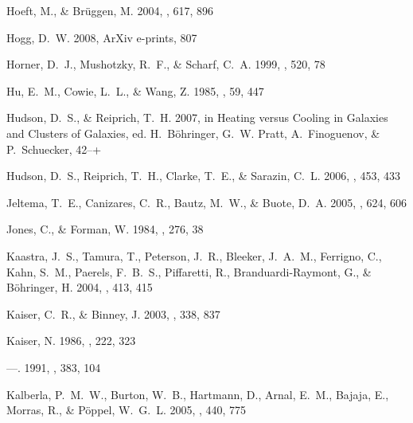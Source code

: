 \documentclass[12pt,preprint]{aastex}
\begin{document}
\begin{thebibliography}{138}
{Hoeft}, M., \& {Br{\"u}ggen}, M. 2004, \apj, 617, 896

{Hogg}, D.~W. 2008, ArXiv e-prints, 807

{Horner}, D.~J., {Mushotzky}, R.~F., \& {Scharf}, C.~A. 1999, \apj, 520, 78

{Hu}, E.~M., {Cowie}, L.~L., \& {Wang}, Z. 1985, \apjs, 59, 447

{Hudson}, D.~S., \& {Reiprich}, T.~H. 2007, in Heating versus Cooling in
  Galaxies and Clusters of Galaxies, ed. H.~{B{\"o}hringer}, G.~W. {Pratt},
  A.~{Finoguenov}, \& P.~{Schuecker}, 42--+

{Hudson}, D.~S., {Reiprich}, T.~H., {Clarke}, T.~E., \& {Sarazin}, C.~L. 2006,
  \aap, 453, 433

{Jeltema}, T.~E., {Canizares}, C.~R., {Bautz}, M.~W., \& {Buote}, D.~A. 2005,
  \apj, 624, 606

{Jones}, C., \& {Forman}, W. 1984, \apj, 276, 38

{Kaastra}, J.~S., {Tamura}, T., {Peterson}, J.~R., {Bleeker}, J.~A.~M.,
  {Ferrigno}, C., {Kahn}, S.~M., {Paerels}, F.~B.~S., {Piffaretti}, R.,
  {Branduardi-Raymont}, G., \& {B{\" o}hringer}, H. 2004, \aap, 413, 415

{Kaiser}, C.~R., \& {Binney}, J. 2003, \mnras, 338, 837

{Kaiser}, N. 1986, \mnras, 222, 323

---. 1991, \apj, 383, 104

{Kalberla}, P.~M.~W., {Burton}, W.~B., {Hartmann}, D., {Arnal}, E.~M.,
  {Bajaja}, E., {Morras}, R., \& {P{\"o}ppel}, W.~G.~L. 2005, \aap, 440, 775


\end{thebibliography}
\end{document}
